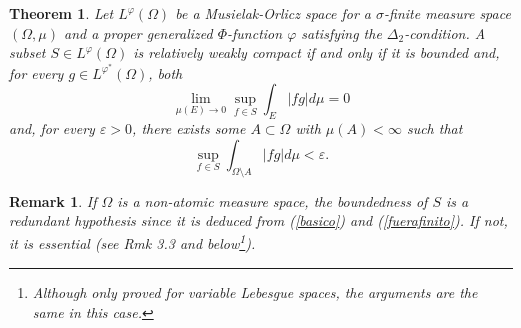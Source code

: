 \documentclass[11pt,a4paper]{amsart}
\newtheorem{teorema}[definicion]{Theorem}
\newtheorem{nota}[definicion]{Remark}
\newcommand{\lphi}{{L^{\varphi}(\Omega)}}
\begin{document}
\begin{teorema}\label{clave}
Let $\lphi$ be a Musielak-Orlicz space for a $\sigma$-finite measure space $(\Omega,\mu)$ and a proper generalized $\Phi$-function $\varphi$ satisfying the $\Delta_2$-condition. A subset $S\in \lphi$ is relatively weakly compact if and only if it is bounded and, for every $g\in L^{\varphi^*}(\Omega)$, both
    \begin{equation}\label{basico}
    \lim_{\mu(E)\rightarrow 0}\sup_{f\in S}\int_E \vert fg\vert d\mu =0
    \end{equation}
    and, for every $\varepsilon>0$, there exists some $A\subset\Omega$ with $\mu(A)<\infty$ such that
    \begin{equation}\label{fuerafinito}
    \sup_{f\in S} \int_{\Omega\setminus A} \vert fg\vert d\mu <\varepsilon.
    \end{equation}
\end{teorema}

\begin{nota}
If $\Omega$ is a non-atomic measure space, the boundedness of $S$ is a redundant hypothesis since it is deduced from (\ref{basico}) and (\ref{fuerafinito}). If not, it is essential (see \cite{PCM3} Rmk 3.3 and below\footnote{Although only proved for variable Lebesgue spaces, the arguments are the same in this case.}).
\end{nota}
\end{document}

